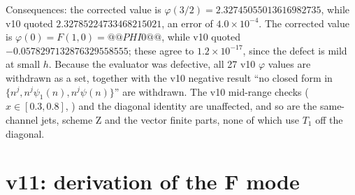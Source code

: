 Consequences: the corrected value is \(\varphi(3/2)=2.32745055013616982735\),
while v10 quoted \(2.32785224733468215021\), an error of
\(4.0\times10^{-4}\). The corrected value is
\(\varphi(0)=F(1,0)=@@PHI0@@\), while v10 quoted
\(-0.0578297132876329558555\); these agree to \(1.2\times10^{-17}\),
since the defect is mild at small \(h\). Because the evaluator was
defective, all 27 v10 \(\varphi\) values are withdrawn as a set,
together with the
v10 negative result ``no closed form in
\(\{n^j,n^j\psi_1(n),n^j\psi(n)\}\)'' are withdrawn. The v10
mid-range checks (\(x\in[0.3,0.8]\), )
and the diagonal identity are unaffected, and so are the
same-channel jets, scheme Z and the vector finite parts, none of
which use \(T_1\) off the diagonal.

\section{v11: derivation of the F mode}
\label{sec:v11IF}

